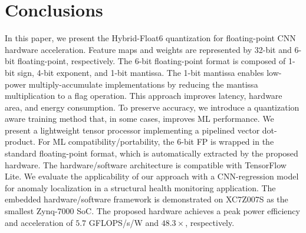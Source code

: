 \section{Conclusions}
\label{sec:conclusions}
In this paper, we present the Hybrid-Float6 quantization for floating-point CNN hardware acceleration. Feature maps and weights are represented by 32-bit and 6-bit floating-point, respectively. The 6-bit floating-point format is composed of 1-bit sign, 4-bit exponent, and 1-bit mantissa. The 1-bit mantissa enables low-power multiply-accumulate implementations by reducing the mantissa multiplication to a flag operation. This approach improves latency, hardware area, and energy consumption. To preserve accuracy, we introduce a quantization aware training method that, in some cases, improves ML performance. We present a lightweight tensor processor implementing a pipelined vector dot-product. For ML compatibility/portability, the 6-bit FP is wrapped in the standard floating-point format, which is automatically extracted by the proposed hardware. The hardware/software architecture is compatible with TensorFlow Lite. We evaluate the applicability of our approach with a CNN-regression model for anomaly localization in a structural health monitoring application. The embedded hardware/software framework is demonstrated on XC7Z007S as the smallest Zynq-7000 SoC. The proposed hardware achieves a peak power efficiency and acceleration of $5.7$ GFLOPS/s/W and $48.3\times$, respectively.